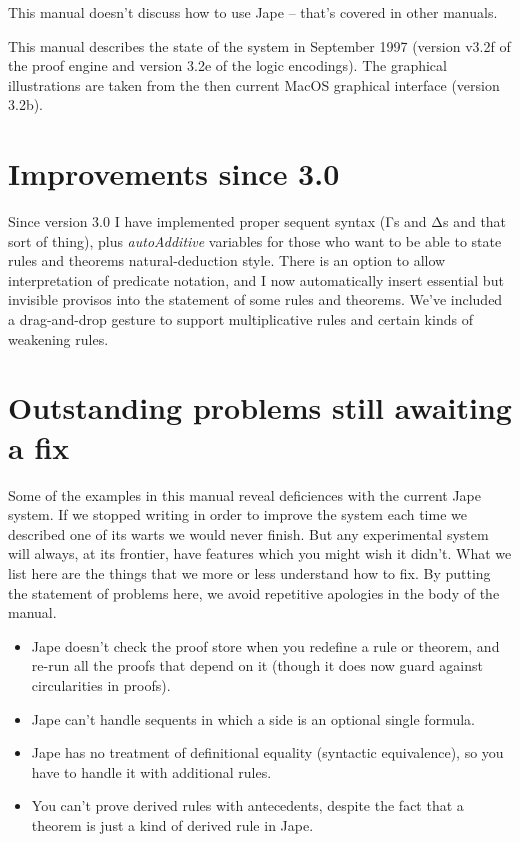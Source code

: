 \documentclass[11pt]{book}
\begin{document}
This manual doesn't discuss how to use Jape -- that's covered in other manuals.

This manual describes the state of the system in September 1997 (version v3.2f of the proof engine and version 3.2e of the logic encodings). The graphical illustrations are taken from the then current MacOS graphical interface (version 3.2b).

\section*{Improvements since 3.0}

Since version 3.0 I have implemented proper sequent syntax (Γs and Δs and that sort of thing), plus \emph{autoAdditive} variables for those who want to be able to state rules and theorems natural-deduction style. There is an option to allow interpretation of predicate notation, and I now automatically insert essential but invisible provisos into the statement of some rules and theorems. We've included a drag-and-drop gesture to support multiplicative rules and certain kinds of weakening rules.

\section*{Outstanding problems still awaiting a fix}

Some of the examples in this manual reveal deficiences with the current Jape system. If we stopped writing in order to improve the system each time we described one of its warts we would never finish. But any experimental system will always, at its frontier, have features which you might wish it didn't. What we list here are the things that we more or less understand how to fix. By putting the statement of problems here, we avoid repetitive apologies in the body of the manual.

\begin{itemize}
\item Jape doesn't check the proof store when you redefine a rule or theorem, and re-run all the proofs that depend on it (though it does now guard against circularities in proofs).
\item Jape can't handle sequents in which a side is an optional single formula.
\item Jape has no treatment of definitional equality (syntactic equivalence), so you have to handle it with additional rules.
\item You can't prove derived rules with antecedents, despite the fact that a theorem is just a kind of derived rule in Jape.
\end{itemize}
\end{document}
